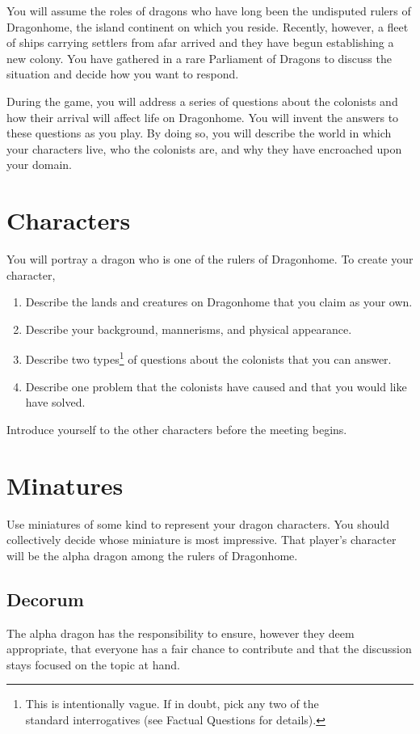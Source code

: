 \documentclass[a6paper, 11pt, parskip=half, DIV=15]{scrartcl}
\begin{document}
You will assume the roles of dragons who have long been the undisputed rulers of Dragonhome, the island continent on which you reside. Recently, however, a fleet of ships carrying settlers from afar arrived and they have begun establishing a new colony. You have gathered in a rare Parliament of Dragons to discuss the situation and decide how you want to respond.

During the game, you will address a series of questions about the colonists and how their arrival will affect life on Dragonhome. You will invent the answers to these questions as you play. By doing so, you will describe the world in which your characters live, who the colonists are, and why they have encroached upon your domain.


\newpage
\enlargethispage{1.75\baselineskip}
\section*{Characters}
You will portray a dragon who is one of the rulers of Dragonhome. To create your character,
\begin{enumerate}[nosep]
	\item Describe the lands and creatures on Dragonhome that you claim as your own.
	\item Describe your background, mannerisms, and physical appearance.
	\item Describe two types\footnote[1]{This is intentionally vague. If in doubt, pick any two of the\\standard interrogatives (see {\setmainfont{Cinzel-Bold}\scriptsize Factual Questions} for details).} of questions about the colonists that you can answer.
	\item Describe one problem that the colonists have caused and that you would like have solved.
\end{enumerate}
Introduce yourself to the other characters before the meeting begins.

\section*{Minatures}
Use miniatures of some kind to represent your dragon characters. You should collectively decide whose miniature is most impressive. That player's character will be the alpha dragon among the rulers of Dragonhome. 

\newpage
\enlargethispage{1.75\baselineskip}
\subsection*{Decorum}
The alpha dragon has the responsibility to ensure, however they deem appropriate, that everyone has a fair chance to contribute and that the discussion stays focused on the topic at hand. %
\end{document}
